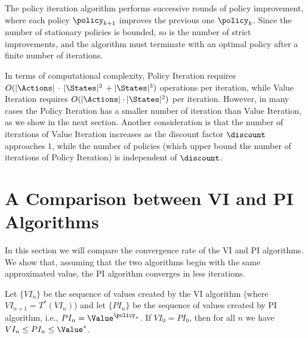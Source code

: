 The policy iteration algorithm performs successive rounds of policy
improvement, where each policy ${\policy _{k + 1}}$ improves the
previous one ${\policy _k}$. Since the number of stationary policies
is bounded, so is the number of strict improvements, and the
algorithm must terminate with an optimal policy after a finite
number of iterations.

In terms of computational complexity, Policy Iteration requires
$O(|\Actions|\, \cdot \,|\States|^2\, + |\States|^3)$ operations per
iteration, while Value Iteration requires $O(|\Actions| \cdot
|\States|^2)$ per iteration.
%
However, in many cases the Policy Iteration has a smaller number of
iteration  than Value Iteration, as we show in the next section.
%
Another consideration is that the number of iterations of Value
Iteration increases as the discount factor $\discount $ approaches
$1$, while the number of policies (which upper bound the number of
iterations of Policy Iteration) is independent of $\discount$.


\section{A Comparison between VI and PI Algorithms}

In this section we will compare the convergence rate of the VI and
PI algorithms. We show that, assuming that the two algorithms begin
with the same approximated value, the PI algorithm converges in less
iterations.
\begin{theorem}
\label{L6:PIVI-ComparisonTh} Let $\{VI_{n}\}$ be the sequence of
values created by the VI algorithm (where $VI_{n+1}=T^*(VI_{n})$)
and let $\{PI_{n}\}$ be the sequence of values created by PI
algorithm, i.e., $PI_n=\Value^{\policy_n}$. If $VI_{0}=PI_{0}$, then
for all $ n$ we have $ VI_{n}\leq PI_{n}\leq \Value^*$.
\end{theorem}

